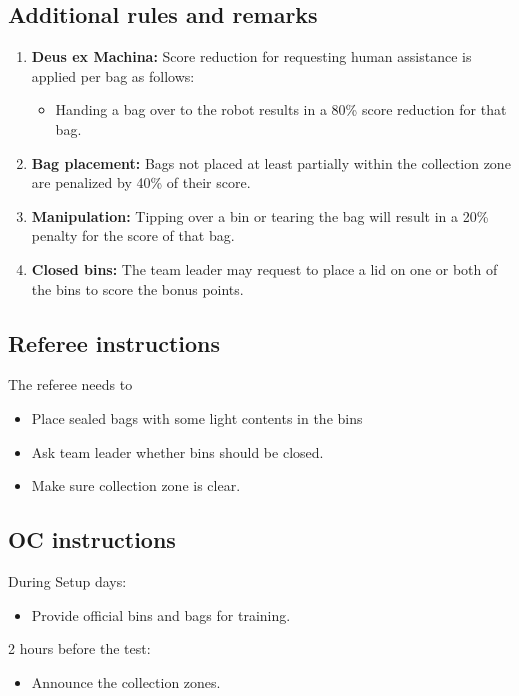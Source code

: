 \subsection{Additional rules and remarks}
\begin{enumerate}[nosep]
	\item \textbf{Deus ex Machina:} Score reduction for requesting human assistance is applied per bag as follows:
	\begin{itemize}[nosep]
		\item Handing a bag over to the robot results in a 80\% score reduction for that bag.
	\end{itemize}

	\item \textbf{Bag placement:} Bags not placed at least partially within the collection zone are penalized by 40\% of their score.
	\item \textbf{Manipulation:}  Tipping over a bin or tearing the bag will result in a 20\% penalty for the score of that bag.
	\item \textbf{Closed bins:} The team leader may request to place a lid on one or both of the bins to score the bonus points.

\end{enumerate}

\subsection{Referee instructions}

The referee needs to
\begin{itemize}
	\item Place sealed bags with some light contents in the bins
	\item Ask team leader whether bins should be closed.
	\item Make sure collection zone is clear.
\end{itemize}

\subsection{OC instructions}
During Setup days:
\begin{itemize}
	\item Provide official bins and bags for training.
\end{itemize}

2 hours before the test:
\begin{itemize}
	\item Announce the collection zones.
\end{itemize}

% 


